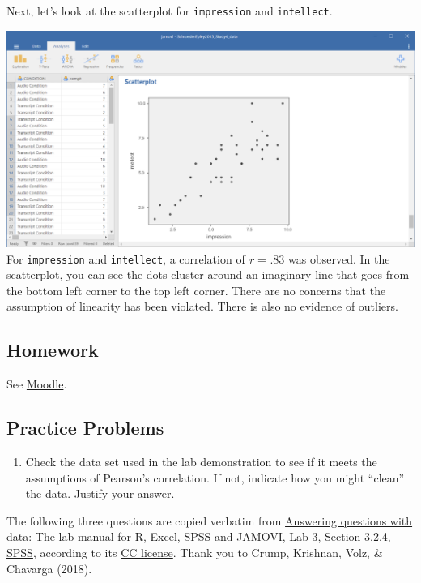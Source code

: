 \documentclass[
]{book}
\providecommand{\tightlist}{%
  \setlength{\itemsep}{0pt}\setlength{\parskip}{0pt}}
\begin{document}
Next, let's look at the scatterplot for \texttt{impression} and \texttt{intellect}.

\includegraphics{img/7.4.72.png}
For \texttt{impression} and \texttt{intellect}, a correlation of \emph{r} = .83 was observed. In the scatterplot, you can see the dots cluster around an imaginary line that goes from the bottom left corner to the top left corner. There are no concerns that the assumption of linearity has been violated. There is also no evidence of outliers.

\hypertarget{homework-6}{%
\subsection{Homework}\label{homework-6}}

See \href{https://moodle.stfx.ca/course/view.php?id=28797}{Moodle}.

\hypertarget{practice-problems-4}{%
\subsection{Practice Problems}\label{practice-problems-4}}

\begin{enumerate}
\def\labelenumi{\arabic{enumi}.}
\tightlist
\item
  Check the data set used in the lab demonstration to see if it meets the assumptions of Pearson's correlation. If not, indicate how you might ``clean'' the data. Justify your answer.
\end{enumerate}

The following three questions are copied verbatim from \href{https://www.crumplab.com/statisticsLab/lab-3-correlation.html\#writing-assignment-2}{Answering questions with data: The lab manual for R, Excel, SPSS and JAMOVI, Lab 3, Section 3.2.4, SPSS}, according to its \href{https://creativecommons.org/licenses/by-sa/4.0/deed.ast}{CC license}. Thank you to Crump, Krishnan, Volz, \& Chavarga (2018).
\end{document}
